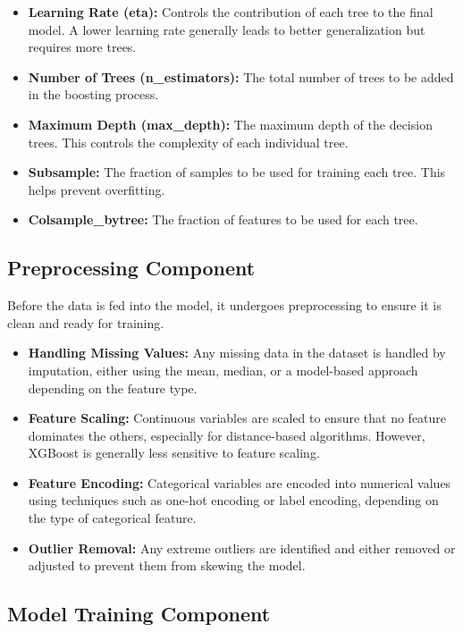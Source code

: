 \documentclass[15pt]{article}
\begin{document}
\begin{itemize}
    \item \textbf{Learning Rate (eta):} Controls the contribution of each tree to the final model. A lower learning rate generally leads to better generalization but requires more trees.
    \item \textbf{Number of Trees (n\_estimators):} The total number of trees to be added in the boosting process.
    \item \textbf{Maximum Depth (max\_depth):} The maximum depth of the decision trees. This controls the complexity of each individual tree.
    \item \textbf{Subsample:} The fraction of samples to be used for training each tree. This helps prevent overfitting.
    \item \textbf{Colsample\_bytree:} The fraction of features to be used for each tree.
\end{itemize}

\subsection{Preprocessing Component}

Before the data is fed into the model, it undergoes preprocessing to ensure it is clean and ready for training.

\begin{itemize}
    \item \textbf{Handling Missing Values:} Any missing data in the dataset is handled by imputation, either using the mean, median, or a model-based approach depending on the feature type.
    \item \textbf{Feature Scaling:} Continuous variables are scaled to ensure that no feature dominates the others, especially for distance-based algorithms. However, XGBoost is generally less sensitive to feature scaling.
    \item \textbf{Feature Encoding:} Categorical variables are encoded into numerical values using techniques such as one-hot encoding or label encoding, depending on the type of categorical feature.
    \item \textbf{Outlier Removal:} Any extreme outliers are identified and either removed or adjusted to prevent them from skewing the model.
\end{itemize}

\subsection{Model Training Component}
\end{document}
